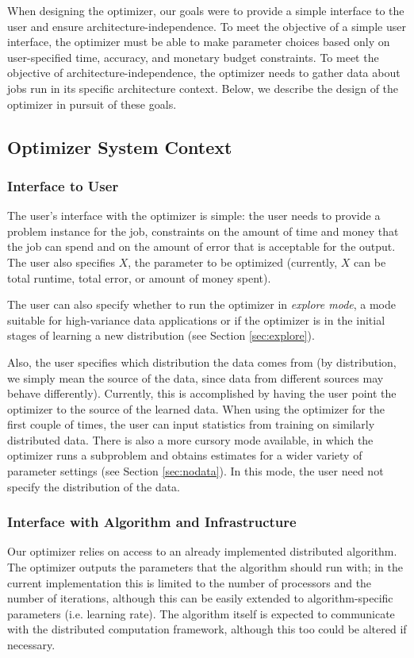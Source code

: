 
When designing the optimizer, our goals were to provide a simple 
interface to the user and ensure architecture-independence. To meet the
objective of a simple user interface, the optimizer must be able to
make parameter choices based only on user-specified time, accuracy, and
monetary budget constraints. To meet
the objective of architecture-independence, the optimizer needs to gather
data about jobs run in its specific architecture context. Below,
we describe the design of the optimizer in pursuit of these goals. 

\subsection{Optimizer System Context}


\subsubsection{Interface to User}
The user's interface with the optimizer is simple: the user needs to
provide a problem instance for the job, constraints on the amount of
time and money that the job can spend and on the amount of error
that is acceptable for the output. The user also specifies $X$, the 
parameter to be optimized (currently, $X$ can be total runtime, total
error, or amount of money spent).

The user can also specify whether to run the optimizer in {\em explore 
mode}, a mode suitable for high-variance data applications or if the 
optimizer is in the initial stages of learning a new 
distribution (see Section \ref{sec:explore}). 

Also, the user specifies which distribution the data comes from (by
distribution, we simply mean the source of the data, since data from
different sources may behave differently). Currently,
this is accomplished by having the user point the optimizer to the 
source of the learned data. When using the optimizer for the first 
couple of times, the user can input statistics from training on similarly
distributed data. There is also a more cursory mode available, in which
the optimizer runs a subproblem and obtains estimates for a wider 
variety of parameter settings (see Section \ref{sec:nodata}). In this 
mode, the user need not specify the distribution of the data. 

\subsubsection{Interface with Algorithm and Infrastructure}
Our optimizer relies on access to an already implemented distributed 
algorithm. The optimizer outputs the parameters that the algorithm 
should run with; in the current implementation this is limited to 
the number of processors and the number of iterations, although this
can be easily extended to algorithm-specific parameters (i.e. learning
rate). 
The algorithm itself is expected to communicate with the distributed
computation framework, although this too could be altered if necessary.

